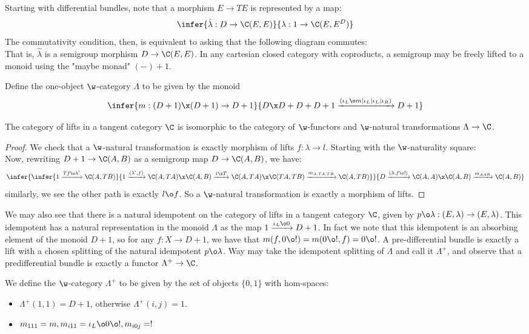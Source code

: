 Starting with differential bundles, note that a morphism $E \to TE$ is represented by a map:
\[
	\infer{\hat{\lambda}:D \to \C(E,E)}{\lambda: 1 \to \C(E, E^D)}
\]
The commutativity condition, then, is equivalent to asking that the following diagram commutes:
\[\]
That is, $\hat{\lambda}$ is a semigroup morphism $D \to \C(E,E)$. 
In any cartesian closed category with coproducts, a semigroup may be freely lifted to a monoid using the "maybe monad" $(-) + 1$.
\begin{definition}
	Define the one-object $\w$-category $\Lambda$ to be given by the monoid 
	\[
		\infer{m: (D+1) \x (D+1) \to D+1}{D \x D + D + D + 1 \xrightarrow{(\iota_L\o m | \iota_L | \iota_L |\iota_R)} D + 1}
	\]
\end{definition}
\begin{lemma}
	The category of lifts in a tangent category $\C$ is isomorphic to the category of $\w$-functors and $\w$-natural transformations $\Lambda \to \C$.
\end{lemma}
\begin{proof}
	We check that a $\w$-natural transformation is exactly morphism of lifts $f: \lambda \to l$.
	Starting with the $\w$-naturality square:
    \[\]
	Now, rewriting $D+1 \to \C(A,B)$ as a semigroup map $D \to \C(A,B)$, we have:
	\[
		\infer{
			\infer{ 
				1 \xrightarrow{Tf \o \lambda'}\C(A,TB) 
			}{ 
				1 \xrightarrow{(\lambda',f)} \C(A,TA) \x \C(A,B) \xrightarrow{1 \x T} \C(A,TA) \x \C(TA,TB) \xrightarrow{m_{A,TA,TB}} \C(A,TB)
			}}{	
			D \xrightarrow{(\lambda,f\o !)} \C(A,A) \x \C(A,B) \xrightarrow{m_{AAB}} \C(A,B)
		}
	\]
	similarly, we see the other path is exactly $l \o f$. So a $\w$-natural transformation is exactly a morphism of lifts.
\end{proof}
We may also see that there is a natural idempotent on the category of lifts in a tangent category $\C$, given by $p \o \lambda: (E,\lambda) \to (E,\lambda)$.
This idempotent has a natural representation in the monoid $\Lambda$ as the map $1 \xrightarrow{\iota_L \o 0} D + 1$.
In fact we note that this idempotent is an absorbing element of the monoid $D+1$, so for any $f:X \to D+1$, we have that $m(f,0\o !) = m(0\o !, f) = 0\o !$. 
A pre-differential bundle is exactly a lift with a chosen splitting of the natural idempotent $p\o\lambda$.
Way may take the idempotent splitting of $\Lambda$ and call it $\Lambda^+$, and observe that a predifferential bundle is exactly a functor $\Lambda^+ \to \C$.
\begin{definition}
	We define the $\w$-category $\Lambda^+$ to be given by the set of objects $\{0,1\}$ with hom-spaces:
	\begin{itemize}
		\item $\Lambda^+(1,1) = D+1$, otherwise $\Lambda^+(i,j) = 1$.
		\item $m_{111} = m, m_{i11} = \iota_L \o 0 \o !, m_{i0j} = !$
	\end{itemize}
\end{definition}

